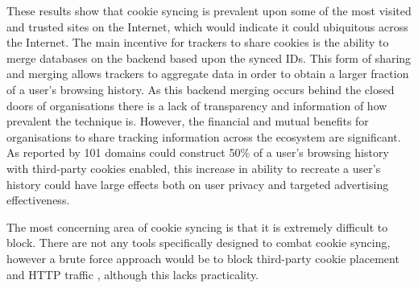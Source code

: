 \documentclass[12pt]{article}
\begin{document}
These results show that cookie syncing is prevalent upon some of the most visited and trusted sites on the Internet, which would indicate it could ubiquitous across the Internet. The main incentive for trackers to share cookies is the ability to merge databases on the backend based upon the synced IDs. This form of sharing and merging allows trackers to aggregate data in order to obtain a larger fraction of a user's browsing history. As this backend merging occurs behind the closed doors of organisations there is a lack of transparency and information of how prevalent the technique is.  However, the financial and mutual benefits for organisations to share tracking information across the ecosystem are significant. As reported by \parencite{webNeverForgets}  101 domains could construct 50\% of a user's browsing history with third-party cookies enabled, this increase in ability to recreate a user's history could have large effects both on user privacy and targeted advertising effectiveness. \newline

The most concerning area of cookie syncing is that it is extremely difficult to block. There are not any tools specifically designed to combat cookie syncing, however a brute force approach would be to block third-party cookie placement and HTTP traffic \parencite{webNeverForgets}, although this lacks practicality. 

\end{document}
